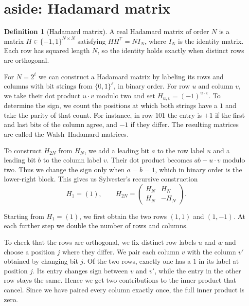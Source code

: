 \documentclass{article}
\theoremstyle{definition}
\newtheorem{definition}[theorem]{Definition}
\begin{document}
\section{aside: Hadamard matrix}

\begin{definition}[Hadamard matrix]\label{def:hadamard}
A real Hadamard matrix of order \(N\) is a matrix
\(H\in\{-1,1\}^{N\times N}\) satisfying \(HH^{\mathsf T}=N I_N\), where
\(I_N\) is the identity matrix. Each row has squared length \(N\), so the
identity holds exactly when distinct rows are orthogonal.
\end{definition}

For \(N=2^\ell\) we can construct a Hadamard matrix by labeling its
rows and columns with bit strings from \(\{0,1\}^\ell\), in binary
order. For row \(u\) and column \(v\), we take their dot product
\(u\cdot v\) modulo two and set \(H_{u,v}=(-1)^{u\cdot v}\).
To determine the sign, we count the positions at which both strings
have a \(1\) and take the parity of that count. For instance, in row \(101\) the
entry is \(+1\) if the first and last bits of the column agree, and
\(-1\) if they differ. The resulting matrices are called the
Walsh--Hadamard matrices.

To construct \(H_{2N}\) from \(H_N\), we add a leading bit \(a\) to
the row label \(u\) and a leading bit \(b\) to the column label \(v\).
Their dot product becomes \(ab+u\cdot v\) modulo two. Thus we change the sign only when
\(a=b=1\), which in binary order is the lower-right block. This gives
us Sylvester's recursive construction
\[
    H_1=(1),\qquad
    H_{2N}=\begin{pmatrix}H_N&H_N\\H_N&-H_N\end{pmatrix}.
\]

Starting from \(H_1=(1)\), we first obtain the two rows \((1,1)\)
and \((1,-1)\). At each further step we double the number of rows
and columns.

To check that the rows are orthogonal, we fix distinct row labels
\(u\) and \(w\) and choose a position \(j\) where they differ. We
pair each column \(v\) with the column \(v'\) obtained by changing
bit \(j\). Of the two rows,
exactly one has a \(1\) in its label at position \(j\). Its entry
changes sign between \(v\) and \(v'\), while the entry in the other
row stays the same. Hence we get two contributions to the inner product
that cancel. Since we have paired every column exactly once, the full
inner product is zero.
\end{document}
